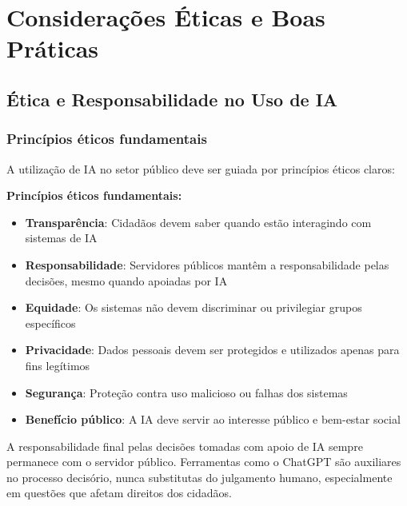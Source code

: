 \documentclass[12pt,a4paper]{book}
\begin{document}
\chapter{Considerações Éticas e Boas Práticas}

\section{Ética e Responsabilidade no Uso de IA}

\subsection{Princípios éticos fundamentais}

A utilização de IA no setor público deve ser guiada por princípios éticos claros:

\textbf{Princípios éticos fundamentais:}
\begin{itemize}
    \item \textbf{Transparência}: Cidadãos devem saber quando estão interagindo com sistemas de IA
    
    \item \textbf{Responsabilidade}: Servidores públicos mantêm a responsabilidade pelas decisões, mesmo quando apoiadas por IA
    
    \item \textbf{Equidade}: Os sistemas não devem discriminar ou privilegiar grupos específicos
    
    \item \textbf{Privacidade}: Dados pessoais devem ser protegidos e utilizados apenas para fins legítimos
    
    \item \textbf{Segurança}: Proteção contra uso malicioso ou falhas dos sistemas
    
    \item \textbf{Benefício público}: A IA deve servir ao interesse público e bem-estar social
\end{itemize}

\begin{tcolorbox}[atencao]
A responsabilidade final pelas decisões tomadas com apoio de IA sempre permanece com o servidor público. Ferramentas como o ChatGPT são auxiliares no processo decisório, nunca substitutas do julgamento humano, especialmente em questões que afetam direitos dos cidadãos.
\end{tcolorbox}
\end{document}

